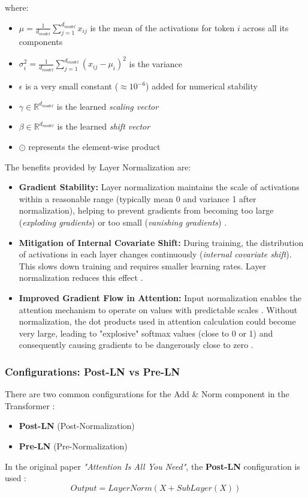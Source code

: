where:
\begin{itemize}
\item $\mu = \frac{1}{d_{model}} \sum^{d_{model}}_{j=1}x_{ij}$ is the mean of the activations for token $i$ across all its components
\item $\sigma^2_i=\frac{1}{d_{model}}\sum^{d_{model}}_{j=1} (x_{ij}-\mu_i)^2 $ is the variance
\item $\epsilon$ is a very small constant ($\approx 10^{-6}$) added for numerical stability
\item $\gamma \in \mathbb{R}^{d_{model}}$ is the learned \textit{scaling vector}
\item $\beta \in \mathbb{R}^{d_{model}}$ is the learned \textit{shift vector}
\item $\odot$ represents the element-wise product
\end{itemize}
The benefits provided by Layer Normalization are:
\begin{itemize}
\item \textbf{Gradient Stability:} Layer normalization maintains the scale of activations within a reasonable range (typically mean 0 and variance 1 after normalization), helping to prevent gradients from becoming too large (\textit{exploding gradients}) or too small (\textit{vanishing gradients}) \cite{arxiv-attention, stanford}.

\item \textbf{Mitigation of Internal Covariate Shift:} During training, the distribution of activations in each layer changes continuously (\textit{internal covariate shift}). This slows down training and requires smaller learning rates. Layer normalization reduces this effect \cite{arxiv-attention, stanford}.

\item \textbf{Improved Gradient Flow in Attention:} Input normalization enables the attention mechanism to operate on values with predictable scales \cite{arxiv-attention}. Without normalization, the dot products used in attention calculation could become very large, leading to "explosive" softmax values (close to 0 or 1) and consequently causing gradients to be dangerously close to zero \cite{arxiv-attention, stanford, GeeksForGeeks}.
\end{itemize}

\subsubsection{Configurations: Post-LN vs Pre-LN}
There are two common configurations for the Add \& Norm component in the Transformer \cite{git-hub, stanford}:
\begin{itemize}
\item \textbf{Post-LN} (Post-Normalization)
\item \textbf{Pre-LN} (Pre-Normalization)
\end{itemize}
In the original paper \textit{"Attention Is All You Need"}, the \textbf{Post-LN} configuration is used \cite{arxiv-attention}:
\begin{equation}
Output = LayerNorm(X + SubLayer(X))
\end{equation}


